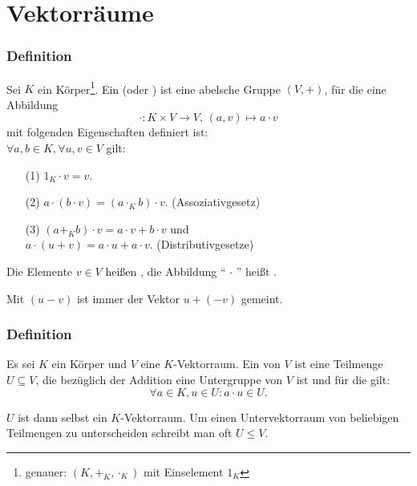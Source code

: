 \section{Vektorräume}
%
\begin{frame}\frametitle{Definition}

	Sei $K$ ein Körper\footnote{genauer: $(K, +_{K}, \cdot_{K})$ mit Einselement $1_{K}$}. 
	Ein  (oder ) 
	ist eine abelsche Gruppe $(V,+)$, für die eine Abbildung
	$$
		\cdot: K\times V \to V,\,
		(a,v) \mapsto a\cdot v 
	$$ 
	mit folgenden Eigenschaften definiert ist:\\[1mm]
	
	$\forall a,b \in K, \forall u,v\in V$ gilt:
	\begin{itemize}
		\item[(1)] 
			$1_{K}\cdot v = v$.
		\item[(2)]
			$a\cdot(b\cdot v) = (a\cdot_{K} b)\cdot v$.
			(Assoziativgesetz)
		\item[(3)]
			$ (a+_{K}b)\cdot v = a\cdot v + b\cdot v$ \quad und\\
			$ a\cdot (u+v) = a\cdot u + a\cdot v.$  
			(Distributivgesetze)
	\end{itemize}
	
	\vfill 
	
	Die Elemente $v\in V$ hei{\ss}en , die Abbildung `` $\cdot$ '' heißt .
	
		\vfill 
	Mit $(u-v)$ ist immer der Vektor $u + (-v)$ gemeint.
	
\end{frame}
%
%
\begin{frame}\frametitle{Definition}
Es sei $K$ ein Körper und $V$ eine $K$-Vektorraum. Ein  von $V$ ist eine Teilmenge $U \subseteq V$, die bezüglich der Addition eine Untergruppe von $V$ ist und für die gilt:
$$
\forall a \in K, u\in U: a \cdot u \in U.
$$

$U$ ist dann selbst ein $K$-Vektorraum. Um einen Untervektorraum von beliebigen Teilmengen zu unterscheiden schreibt man oft $U\le V$.
\end{frame}
%
